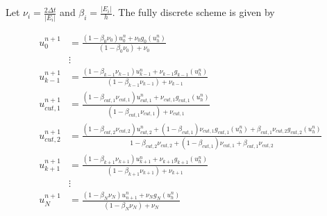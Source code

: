 \documentclass[]{article}
\begin{document}
Let $\nu_i = \frac{2 \Delta t}{|E_i|}$ and $\beta_i = \frac{|E_i|}{h}$. The fully discrete scheme is given by

\begin{align*}
	u_0^{n+1}& = \frac{(1 - \beta_0 \nu_0) u_0^n + \nu_0 g_0(u_h^n)}{(1 - \beta_0 \nu_0) + \nu_0}\\
	& \vdots \\
	u_{k-1}^{n+1} & = \frac{(1 - \beta_{k-1} \nu_{k-1}) u_{k-1}^n + \nu_{k-1} g_{k-1}(u_h^n)}{(1 - \beta_{k-1} \nu_{k-1}) + \nu_{k-1}}\\
	u_{cut, 1}^{n+1} & = \frac{(1 - \beta_{cut, 1} \nu_{cut, 1}) u_{cut, 1}^n + \nu_{cut, 1} g_{cut, 1}(u_h^n)}{(1 - \beta_{cut, 1} \nu_{cut, 1}) + \nu_{cut, 1}}\\
	u_{cut, 2}^{n+1}  & = \frac{(1 - \beta_{cut, 2} \nu_{cut, 2}) u_{cut, 2}^n + (1 - \beta_{cut, 1}) \nu_{cut, 1} g_{cut, 1} (u_h^n) + \beta_{cut, 1} \nu_{cut, 2} g_{cut, 2}(u_h^n)}{1 - \beta_{cut, 2} \nu_{cut, 2} + (1 - \beta_{cut, 1}) \nu_{cut, 1} + \beta_{cut, 1} \nu_{cut, 2}}\\
	u_{k+1}^{n+1}  & = \frac{(1 - \beta_{k+1} \nu_{k+1}) u_{k+1}^n + \nu_{k+1} g_{k+1}(u_h^n)}{(1 - \beta_{k+1} \nu_{k+1}) + \nu_{k+1}}\\
	& \vdots\\
	u_N^{n+1} & = \frac{(1 - \beta_N \nu_N) u_{n+1}^n + \nu_N g_N(u_h^n)}{(1 - \beta_N \nu_N) + \nu_N}
\end{align*}
\end{document}
